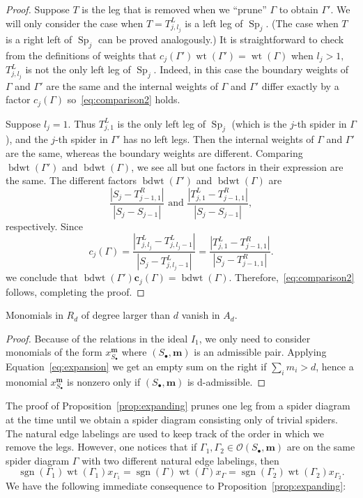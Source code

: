 \documentclass[ALCO,ThmDefs,Unicode,epreuves]{cedram}
\newcommand{\bm}[1]{{\boldsymbol{#1}}}
\renewcommand\c{\bm{c}}
\newcommand\m{\bm{m}}
\DeclareMathOperator{\wt}{wt}
\DeclareMathOperator{\bdwt}{bdwt}
\DeclareMathOperator{\Sp}{Sp}
\DeclareMathOperator{\sgn}{sgn}
\newcommand{\D}{{\Gamma}}
\newcommand{\lspd}{\mathcal O}
\begin{document}
\begin{proof}
	Suppose $T$ is the leg that is removed when we ``prune'' $\D$ to obtain $\D'.$ We will only consider the case when $T= T^L_{j,l_j}$ is a left leg of $\Sp_j.$ (The case when $T$ is a right left of $\Sp_j$ can be proved analogously.) 
	It is straightforward to check from the definitions of weights that $c_j(\D')\wt(\D')=\wt(\D)$ when $l_j >1,$ \ie $T^L_{j,l_j}$ is not the only left leg of $\Sp_j$. Indeed, in this case the boundary weights of $\D$ and $\D'$ are the same and the internal weights of $\D$ and $\D'$ differ exactly by a factor $c_j(\D)$ so~\eqref{eq:comparison2} holds. 
	
	Suppose $l_j=1.$ Thus $T^L_{j,1}$ is the only left leg of $\Sp_j$ (which is the $j$-th spider in $\D$), and the $j$-th spider in $\D'$ has no left legs. Then the internal weights of $\D$ and $\D'$ are the same, whereas the boundary weights are different. Comparing $\bdwt(\D')$ and $\bdwt(\D)$, we see all but one factors in their expression are the same. The different factors $\bdwt(\D')$ and $\bdwt(\D)$ are
	\[ \dfrac{|S_j-T^R_{j-1,1}|}{|S_j-S_{j-1}|} \text{ and } \frac{|T^L_{j,1}-T^R_{j-1,1}|}{|S_j-S_{j-1}|},\]
	respectively.
	Since
	\[ c_j(\Gamma) =\dfrac{|T^L_{j,l_j}-T^L_{j,l_j-1}|}{|S_j-T^L_{j,l_j-1}|} 
	= \dfrac{|T^L_{j,1}-T^R_{j-1,1}|}{|S_j-T^R_{j-1,1}|}.\]
	we conclude that $\bdwt(\D') \c_j(\D) =\bdwt(\D)$. Therefore,~\eqref{eq:comparison2} follows, completing the proof.
\end{proof}

\begin{coro}\label{cor:highdegree}
	Monomials in $R_d$ of degree larger than $d$ vanish in $A_d$.
\end{coro}
\begin{proof}
	Because of the relations in the ideal $I_1$, we only need to consider monomials of the form $x_{S_\bullet}^\m$ where $(S_\bullet,\m)$ is an admissible pair. Applying Equation~\eqref{eq:expansion} we get an empty sum on the right if $\sum_i m_i>d$, hence a monomial $x_{S_\bullet}^\m$ is nonzero only if $(S_\bullet,\m)$ is d-admissible.
\end{proof}

The proof of Proposition~\ref{prop:expanding} prunes one leg from a spider diagram at the time until we obtain a spider diagram consisting only of trivial spiders. The natural edge labelings are used to keep track of the order in which we remove the legs. However, one notices that if $\D_1, \D_2 \in \lspd(S_\bullet,\m)$ are on the same spider diagram $\D$ with two different natural edge labelings, 
then 
\[ \sgn(\D_1)\wt(\D_1)x_{\D_1} = \sgn(\D)\wt(\D)x_\D = \sgn(\D_2)\wt(\D_2)x_{\D_2}.\]
We have the following immediate consequence to Proposition~\ref{prop:expanding}:
\end{document}
